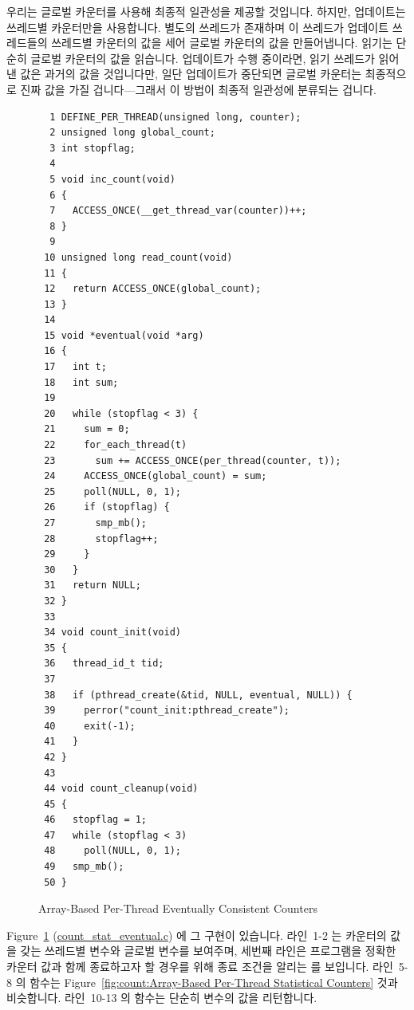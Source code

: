 우리는 글로벌 카운터를 사용해 최종적 일관성을 제공할 것입니다.
하지만, 업데이트는 쓰레드별 카운터만을 사용합니다.
별도의 쓰레드가 존재하며 이 쓰레드가 업데이트 쓰레드들의 쓰레드별 카운터의 값을
세어 글로벌 카운터의 값을 만들어냅니다.
읽기는 단순히 글로벌 카운터의 값을 읽습니다.
업데이트가 수행 중이라면, 읽기 쓰레드가 읽어낸 값은 과거의 값을 것입니다만,
일단 업데이트가 중단되면 글로벌 카운터는 최종적으로 진짜 값을 가질
겁니다---그래서 이 방법이 최종적 일관성에 분류되는 겁니다.

\begin{figure}[tbp]
{ \scriptsize
\begin{verbatim}
  1 DEFINE_PER_THREAD(unsigned long, counter);
  2 unsigned long global_count;
  3 int stopflag;
  4 
  5 void inc_count(void)
  6 {
  7   ACCESS_ONCE(__get_thread_var(counter))++;
  8 }
  9 
 10 unsigned long read_count(void)
 11 {
 12   return ACCESS_ONCE(global_count);
 13 }
 14 
 15 void *eventual(void *arg)
 16 {
 17   int t;
 18   int sum;
 19 
 20   while (stopflag < 3) {
 21     sum = 0;
 22     for_each_thread(t)
 23       sum += ACCESS_ONCE(per_thread(counter, t));
 24     ACCESS_ONCE(global_count) = sum;
 25     poll(NULL, 0, 1);
 26     if (stopflag) {
 27       smp_mb();
 28       stopflag++;
 29     }
 30   }
 31   return NULL;
 32 }
 33 
 34 void count_init(void)
 35 {
 36   thread_id_t tid;
 37 
 38   if (pthread_create(&tid, NULL, eventual, NULL)) {
 39     perror("count_init:pthread_create");
 40     exit(-1);
 41   }
 42 }
 43 
 44 void count_cleanup(void)
 45 {
 46   stopflag = 1;
 47   while (stopflag < 3)
 48     poll(NULL, 0, 1);
 49   smp_mb();
 50 }
\end{verbatim}
}
\caption{Array-Based Per-Thread Eventually Consistent Counters}
\label{fig:count:Array-Based Per-Thread Eventually Consistent Counters}
\end{figure}

Figure~\ref{fig:count:Array-Based Per-Thread Eventually Consistent Counters}
(\url{count_stat_eventual.c}) 에 그 구현이 있습니다.
라인~1-2 는 카운터의 값을 갖는 쓰레드별 변수와 글로벌 변수를 보여주며, 세번째
라인은 프로그램을 정확한 카운터 값과 함께 종료하고자 할 경우를 위해 종료 조건을
알리는  를 보입니다.
라인~5-8 의  함수는 Figure~\ref{fig:count:Array-Based
Per-Thread Statistical Counters} 것과 비슷합니다.
라인~10-13 의  함수는 단순히  변수의 값을
리턴합니다.
\iffalse

